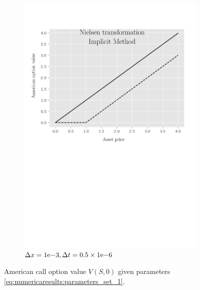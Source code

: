 \begin{figure}[tbp]
\begin{subfigure}{0.4\textwidth}
    \includegraphics[width=\textwidth]{chapters/chapter3/TestCase1ImplicitNielsen.pdf}
    \caption{$\Delta{x}={1}\mathrm{e}{-3}, \Delta{t}=0.5\times{1}\mathrm{e}{-6}$}
    \label{fig:finitedifferencesschemes:numericaresults:test_case_1_implicit_nielsen}
  \end{subfigure}
  \caption{American call option value $V(S, 0)$ given parameters \eqref{eq:numericaresults:parameters_set_1}.}
  \label{fig:finitedifferencesschemes:numericaresults:test_case_1_explicit}
\end{figure}

